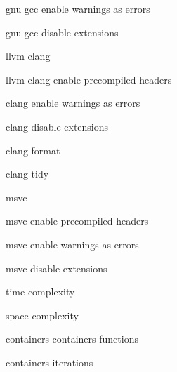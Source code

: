          gnu gcc enable warnings as errors
        
         gnu gcc disable extensions 
        
         llvm clang 
        
         llvm clang enable precompiled headers 
        
         clang enable warnings as errors
        
         clang disable extensions 
        
         clang format 
        
         clang tidy 
        
         msvc  
        
         msvc enable precompiled headers 
        
         msvc enable warnings as errors
        
         msvc disable extensions 

         time complexity
        
         space complexity
        
         containers
         containers functions
        
         containers iterations
        
